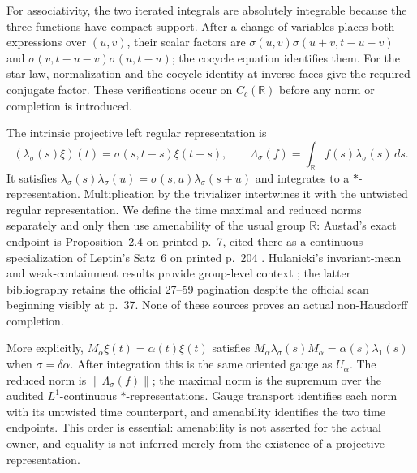 \documentclass[11pt]{article}
\theoremstyle{definition}
\newcommand{\R}{\mathbb R}
\begin{document}
For associativity, the two iterated integrals are absolutely integrable
because the three functions have compact support.  After a change of
variables places both expressions over $(u,v)$, their scalar factors are
$\sigma(u,v)\sigma(u+v,t-u-v)$ and
$\sigma(v,t-u-v)\sigma(u,t-u)$; the cocycle equation identifies them.
For the star law, normalization and the cocycle identity at inverse faces
give the required conjugate factor.  These verifications occur on
$C_c(\R)$ before any norm or completion is introduced.

The intrinsic projective left regular representation is
\[
 (\lambda_\sigma(s)\xi)(t)=\sigma(s,t-s)\xi(t-s),
 \qquad
 \Lambda_\sigma(f)=\int_{\R}f(s)\lambda_\sigma(s)\,ds.
\]
It satisfies
$\lambda_\sigma(s)\lambda_\sigma(u)=
\sigma(s,u)\lambda_\sigma(s+u)$ and integrates to a
$*$-representation.  Multiplication by the trivializer intertwines it with
the untwisted regular representation.  We define the time maximal and
reduced norms separately and only then use amenability of the usual group
$\R$: Austad's exact endpoint is Proposition~2.4 on printed p.~7, cited
there as a continuous specialization of Leptin's Satz~6 on printed p.~204
\citep{Austad2021Spectral,Leptin1968Darstellungen}.  Hulanicki's
invariant-mean and weak-containment results provide group-level context
\citep[pp.~87--88]{Hulanicki1966Folner}
\citep[visible printed pp.~56--58]{Hulanicki1964WeakContainment}; the latter
bibliography retains the official 27--59 pagination despite the official
scan beginning visibly at p.~37.  None of these sources proves an actual
non-Hausdorff completion.

More explicitly, $M_\alpha\xi(t)=\alpha(t)\xi(t)$ satisfies
$M_\alpha\lambda_\sigma(s)M_{\overline\alpha}
=\alpha(s)\lambda_1(s)$ when $\sigma=\delta\alpha$.  After integration this
is the same oriented gauge as $U_\alpha$.  The reduced norm is
$\lVert\Lambda_\sigma(f)\rVert$; the maximal norm is the supremum over the
audited $L^1$-continuous $*$-representations.  Gauge transport identifies
each norm with its untwisted time counterpart, and amenability identifies
the two time endpoints.  This order is essential: amenability is not
asserted for the actual owner, and equality is not inferred merely from the
existence of a projective representation.
\end{document}
